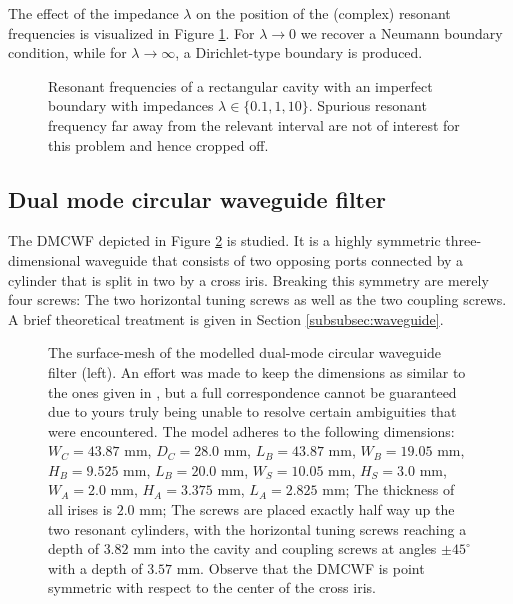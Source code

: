 \documentclass[11pt, a4paper]{article}
\begin{document}
The effect of the impedance $\lambda$ on the position of the (complex) resonant
frequencies is visualized in Figure \ref{fig:imperfect-conductor-eigfreqs}.
For $\lambda \to 0$ we recover a Neumann boundary condition, while for 
$\lambda \to \infty$, a Dirichlet-type boundary is produced.
\begin{figure}[ht]
    \centering
    
    \caption{Resonant frequencies of a rectangular cavity with an imperfect boundary
    with impedances $\lambda \in \{0.1, 1, 10\}$. Spurious resonant frequency far
    away from the relevant interval are not of interest for this problem and hence
    cropped off.}
    \label{fig:imperfect-conductor-eigfreqs}
\end{figure}

\clearpage
\subsection{Dual mode circular waveguide filter}
\label{subsec:examples-dmcwf}

The \acrfull{DMCWF} depicted in Figure \ref{fig:DMCWF} is studied. It is a
highly symmetric three-dimensional waveguide that consists of two opposing
ports connected by a cylinder that is split in two by a cross iris. 
Breaking this symmetry are merely four screws: The two horizontal tuning
screws as well as the two coupling screws. A brief theoretical treatment is given
in Section \ref{subsubsec:waveguide}.

\begin{figure}[h]
    \centering
    
    \caption{The surface-mesh of the modelled dual-mode circular waveguide filter
    (left). An effort was made to keep the dimensions as similar to the ones
    given in \cite{DMCWF-Dimensions}, but a full correspondence cannot be guaranteed
    due to yours truly being unable to resolve certain ambiguities that were encountered.
    The model adheres to the following dimensions:
    $W_C=43.87$ mm, $D_C=28.0$ mm, $L_B=43.87$ mm, $W_B=19.05$ mm, $H_B=9.525$ mm,
    $L_B=20.0$ mm, $W_S=10.05$ mm, $H_S=3.0$ mm, $W_A=2.0$ mm, $H_A=3.375$ mm,
    $L_A=2.825$ mm; The thickness of all irises is $2.0$ mm; The screws
    are placed exactly half way up the two resonant cylinders,
    with the horizontal tuning screws reaching a depth of $3.82$ mm into the cavity
    and coupling screws at angles $\pm 45^{\circ}$ with a depth of $3.57$ mm.
    Observe that the \acrshort{DMCWF} is point symmetric with respect to the center 
    of the cross iris.}
    \label{fig:DMCWF}
\end{figure}
\end{document}
